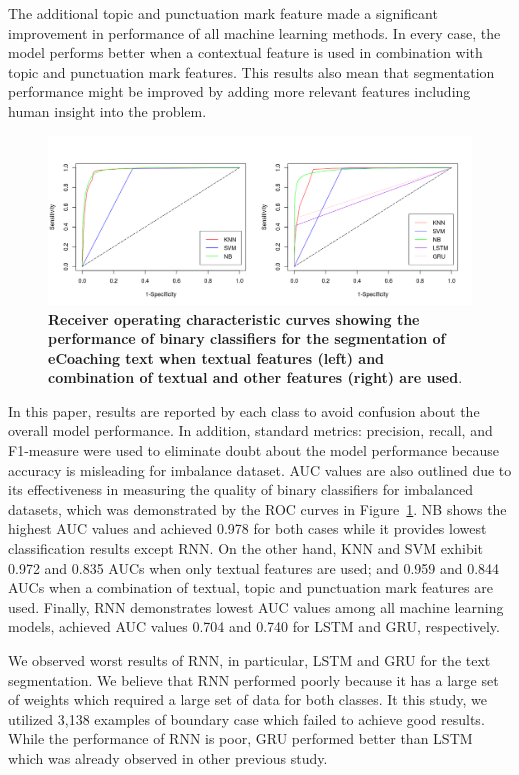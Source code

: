 \documentclass{amia}
\begin{document}
The additional topic and punctuation mark feature made a significant improvement in performance of all machine learning methods. In every case, the model performs better when a contextual feature is used in combination with topic and punctuation mark features. This results also mean that segmentation performance might be improved by adding more relevant features including human insight into the problem.       

\begin{figure}[!htb]
    \centering
    \includegraphics[width=1.0\textwidth]{figures/roc-curves.png}
    \caption{\textbf{Receiver operating characteristic curves showing the performance of binary classifiers for the segmentation of eCoaching text when textual features (left) and combination of textual and other features (right) are used}.}
    \label{fig:roc-curves}
\end{figure}

In this paper, results are reported by each class to avoid confusion about the overall model performance. In addition, standard metrics: precision, recall, and F1-measure were used to eliminate doubt about the model performance because accuracy is misleading for imbalance dataset. AUC values are also outlined due to its effectiveness in measuring the quality of binary classifiers for imbalanced datasets\cite{hu2015kernelized}, which was demonstrated by the ROC curves in Figure~\ref{fig:roc-curves}. NB shows the highest AUC values and achieved 0.978 for both cases while it provides lowest classification results except RNN. On the other hand, KNN and SVM exhibit 0.972 and 0.835 AUCs when only textual features are used; and 0.959 and 0.844 AUCs when a combination of textual, topic and punctuation mark features are used. Finally, RNN demonstrates lowest AUC values among all machine learning models, achieved AUC values 0.704 and 0.740 for LSTM and GRU, respectively. 

We observed worst results of RNN, in particular, LSTM and GRU for the text segmentation. We believe that RNN performed poorly because it has a large set of weights which required a large set of data for both classes. It this study, we utilized 3,138 examples of boundary case which failed to achieve good results. While the performance of RNN is poor, GRU performed better than LSTM which was already observed in other previous study\cite{chung2014empirical}.
\end{document}
